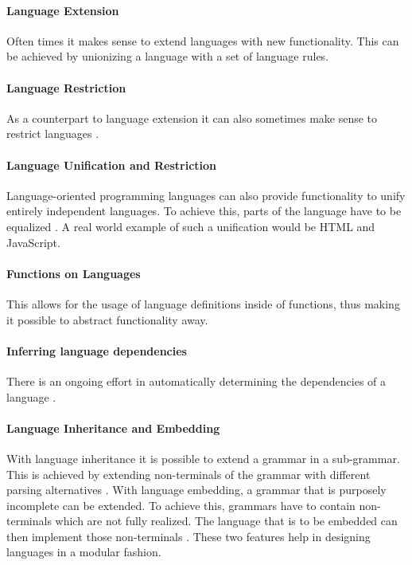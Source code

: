 \paragraph{Language Extension}
Often times it makes sense to extend languages with new functionality. This can be achieved by unionizing a language with a set of language rules.

\paragraph{Language Restriction}
As a counterpart to language extension it can also sometimes make sense to restrict languages \cite{erdweg_language_2012}.

\paragraph{Language Unification and Restriction}
Language-oriented programming languages can also provide functionality to unify entirely independent languages. To achieve this, parts of the language have to be equalized \cite{erdweg_language_2012}. A real world example of such a unification would be HTML and JavaScript.

\paragraph{Functions on Languages}
This allows for the usage of language definitions inside of functions, thus making it possible to abstract functionality away.

\paragraph{Inferring language dependencies}
There is an ongoing effort in automatically determining the dependencies of a language \cite{mendez-acuna_leveraging_2016,kuhn_choosy_2015,butting_modeling_2018}.


\paragraph{Language Inheritance and Embedding}
With language inheritance it is possible to extend a grammar in a sub-grammar. This is achieved by extending non-terminals of the grammar with different parsing alternatives \cite{krahn_monticore_2010}. With language embedding, a grammar that is purposely incomplete can be extended. To achieve this, grammars have to contain non-terminals which are not fully realized. The language that is to be embedded can then implement those non-terminals \cite{krahn_monticore_2010}. These two features help in designing languages in a modular fashion.


